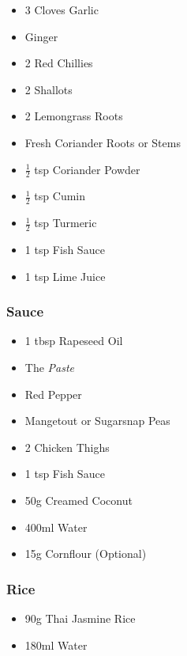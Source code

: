 \documentclass[11pt, english]{article}
\begin{document}
	\begin{itemize}
        \setlength\itemsep{0cm}
		\item 3 Cloves Garlic
                \item Ginger
                \item 2 Red Chillies
                \item 2 Shallots
                \item 2 Lemongrass Roots
                \item Fresh Coriander Roots or Stems
		\item $\frac{1}{2}$ tsp Coriander Powder
                \item $\frac{1}{2}$ tsp Cumin
		\item $\frac{1}{2}$ tsp Turmeric
                \item 1 tsp Fish Sauce
                \item 1 tsp Lime Juice
        \end{itemize}

		\subsubsection*{Sauce}

	\begin{itemize}
        \setlength\itemsep{0cm}
                \item 1 tbsp Rapeseed Oil
                \item The \textit{Paste}
                \item Red Pepper
		\item Mangetout or Sugarsnap Peas
                \item 2 Chicken Thighs
                \item 1 tsp Fish Sauce
                \item 50g Creamed Coconut
		\item 400ml Water
		\item 15g Cornflour (Optional)
        \end{itemize}

		\subsubsection*{Rice}

	\begin{itemize}
        \setlength\itemsep{0cm}
                \item 90g Thai Jasmine Rice
		\item 180ml Water
        \end{itemize}
\end{document}
